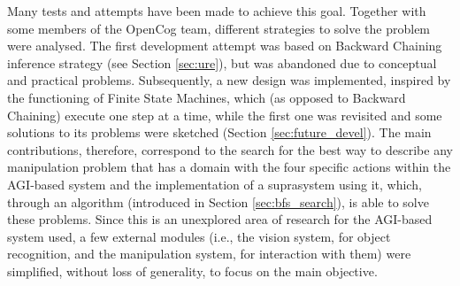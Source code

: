 Many tests and attempts have been made to achieve this goal. Together with some members of the OpenCog team, different strategies to solve the problem were analysed\footnotemark{}. The first development attempt was based on Backward Chaining inference strategy (see Section \ref{sec:ure}), but was abandoned due to conceptual and practical problems. Subsequently, a new design was implemented, inspired by the functioning of Finite State Machines, which (as opposed to Backward Chaining) execute one step at a time, while the first one was revisited and some solutions to its problems were sketched (Section \ref{sec:future_devel}).
The main contributions, therefore, correspond to the search for the best way to describe any manipulation problem that has a domain with the four specific actions within the AGI-based system and the implementation of a suprasystem using it, which, through an algorithm (introduced in Section \ref{sec:bfs_search}), is able to solve these problems.
Since this is an unexplored area of research for the AGI-based system used, a few external modules (i.e., the vision system, for object recognition, and the manipulation system, for interaction with them) were simplified, without loss of generality, to focus on the main objective.  
